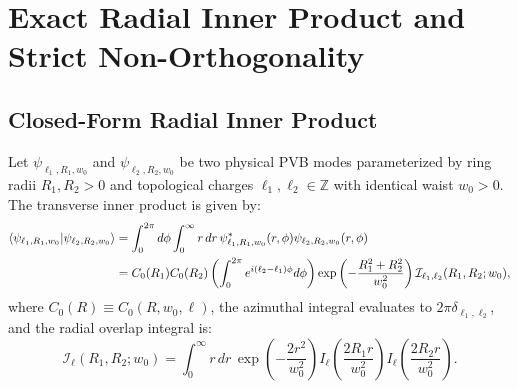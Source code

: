 \documentclass[11pt,a4paper]{article}
\begin{document}
\section{Exact Radial Inner Product and Strict Non-Orthogonality}
\label{sec:inner_product}

\subsection{Closed-Form Radial Inner Product}

Let $\psi_{\ell_1, R_1, w_0}$ and $\psi_{\ell_2, R_2, w_0}$ be two physical PVB modes parameterized by ring radii $R_1, R_2 > 0$ and topological charges $\ell_1, \ell_2 \in \mathbb{Z}$ with identical waist $w_0 > 0$. The transverse inner product is given by:
\begin{align}
\langle \psi_{\ell_1, R_1, w_0} | \psi_{\ell_2, R_2, w_0} \rangle &= \int_0^{2\pi} d\phi \int_0^\infty r \, dr \, \psi_{\ell_1, R_1, w_0}^*(r, \phi) \psi_{\ell_2, R_2, w_0}(r, \phi) \notag \\
&= C_0(R_1) C_0(R_2) \left( \int_0^{2\pi} e^{i(\ell_2 - \ell_1)\phi} d\phi \right) \exp\left( - \frac{R_1^2 + R_2^2}{w_0^2} \right) \mathcal{I}_{\ell_1, \ell_2}(R_1, R_2; w_0),
\label{eq:inner_product_setup}
\end{align}
where $C_0(R) \equiv C_0(R, w_0, \ell)$, the azimuthal integral evaluates to $2\pi \delta_{\ell_1, \ell_2}$, and the radial overlap integral is:
\begin{equation}
\mathcal{I}_\ell(R_1, R_2; w_0) = \int_0^\infty r \, dr \, \exp\left( - \frac{2 r^2}{w_0^2} \right) I_\ell\left( \frac{2 R_1 r}{w_0^2} \right) I_\ell\left( \frac{2 R_2 r}{w_0^2} \right).
\label{eq:radial_overlap_integral}
\end{equation}
\end{document}
